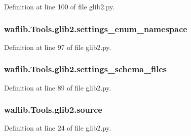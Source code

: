 Definition at line 100 of file glib2.\+py.

\subsubsection[{\texorpdfstring{settings\+\_\+enum\+\_\+namespace}{settings_enum_namespace}}]{\setlength{\rightskip}{0pt plus 5cm}waflib.\+Tools.\+glib2.\+settings\+\_\+enum\+\_\+namespace}\hypertarget{namespacewaflib_1_1_tools_1_1glib2_aadec49bc7d0bcff250cdbcc9ccafcf5d}{}\label{namespacewaflib_1_1_tools_1_1glib2_aadec49bc7d0bcff250cdbcc9ccafcf5d}


Definition at line 97 of file glib2.\+py.

\subsubsection[{\texorpdfstring{settings\+\_\+schema\+\_\+files}{settings_schema_files}}]{\setlength{\rightskip}{0pt plus 5cm}waflib.\+Tools.\+glib2.\+settings\+\_\+schema\+\_\+files}\hypertarget{namespacewaflib_1_1_tools_1_1glib2_aec9fd9d9f89530be04d17e74e40f083b}{}\label{namespacewaflib_1_1_tools_1_1glib2_aec9fd9d9f89530be04d17e74e40f083b}


Definition at line 89 of file glib2.\+py.

\subsubsection[{\texorpdfstring{source}{source}}]{\setlength{\rightskip}{0pt plus 5cm}waflib.\+Tools.\+glib2.\+source}\hypertarget{namespacewaflib_1_1_tools_1_1glib2_aed296e0a65eb90e6dbf195a192acc9a2}{}\label{namespacewaflib_1_1_tools_1_1glib2_aed296e0a65eb90e6dbf195a192acc9a2}


Definition at line 24 of file glib2.\+py.

